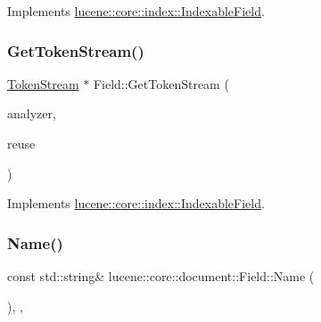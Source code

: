 Implements \mbox{\hyperlink{classlucene_1_1core_1_1index_1_1IndexableField_a008a8b0a96618b1600ad2b44e9357451}{lucene\+::core\+::index\+::\+Indexable\+Field}}.

\mbox{\label{classlucene_1_1core_1_1document_1_1Field_aa3d6b7ab7cb42820491c036872190317}} 
\subsubsection{\texorpdfstring{Get\+Token\+Stream()}{GetTokenStream()}}
{\footnotesize\ttfamily \mbox{\hyperlink{classlucene_1_1core_1_1analysis_1_1TokenStream}{Token\+Stream}} $\ast$ Field\+::\+Get\+Token\+Stream (\begin{DoxyParamCaption}\item[{\mbox{\hyperlink{classlucene_1_1core_1_1analysis_1_1Analyzer}{lucene\+::core\+::analysis\+::\+Analyzer}} \&}]{analyzer,  }\item[{\mbox{\hyperlink{classlucene_1_1core_1_1analysis_1_1TokenStream}{lucene\+::core\+::analysis\+::\+Token\+Stream}} \&}]{reuse }\end{DoxyParamCaption})\hspace{0.3cm}{\ttfamily [virtual]}}



Implements \mbox{\hyperlink{classlucene_1_1core_1_1index_1_1IndexableField_a9df5c2708bdb7936a7e070ee9866ee27}{lucene\+::core\+::index\+::\+Indexable\+Field}}.

\mbox{\label{classlucene_1_1core_1_1document_1_1Field_aec97d60c8348878b7fbaed0be2e3c023}} 
\subsubsection{\texorpdfstring{Name()}{Name()}}
{\footnotesize\ttfamily const std\+::string\& lucene\+::core\+::document\+::\+Field\+::\+Name (\begin{DoxyParamCaption}{ }\end{DoxyParamCaption})\hspace{0.3cm}{\ttfamily [inline]}, {\ttfamily [virtual]}, {\ttfamily [noexcept]}}



